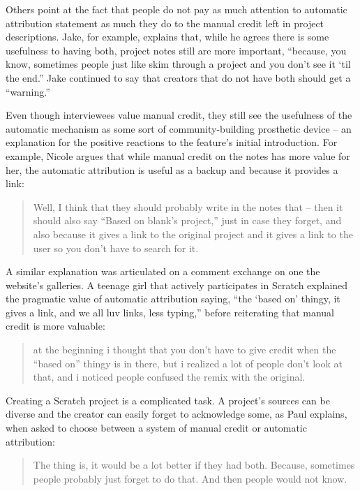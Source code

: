 Others point at the fact that people do not pay as much attention to
automatic attribution statement as much they do to the manual credit
left in project descriptions. Jake, for example, explains that, while
he agrees there is some usefulness to having both, project notes still
are more important, ``because, you know, sometimes people just like
skim through a project and you don’t see it ‘til the end.''  Jake
continued to say that creators that do not have both should get a
``warning.''

Even though interviewees value manual credit, they still see the
usefulness of the automatic mechanism as some sort of
community-building prosthetic device -- an explanation for the
positive reactions to the feature's initial introduction. For example,
Nicole argues that while manual credit on the notes has more value for
her, the automatic attribution is useful as a backup and because it
provides a link:

\begin{quote}
  Well, I think that they should probably write in the notes that --
  then it should also say ``Based on blank's project,'' just in case
  they forget, and also because it gives a link to the original
  project and it gives a link to the user so you don't have to search
  for it.
\end{quote}

A similar explanation was articulated on a comment exchange on one the
website's galleries. A teenage girl that actively participates in
Scratch explained the pragmatic value of automatic attribution saying,
``the `based on' thingy, it gives a link, and we all luv links, less
typing,'' before reiterating that manual credit is more valuable:

\begin{quote}
  at the beginning i thought that you don't have to give credit when
  the ``based on'' thingy is in there, but i realized a lot of people
  don't look at that, and i noticed people confused the remix with the
  original.
\end{quote}


Creating a Scratch project is a complicated task. A project's sources
can be diverse and the creator can easily forget to acknowledge some,
as Paul explains, when asked to choose between a system of manual
credit or automatic attribution:

\begin{quote}
  The thing is, it would be a lot better if they had both. Because,
  sometimes people probably just forget to do that. And then people
  would not know.
\end{quote}

